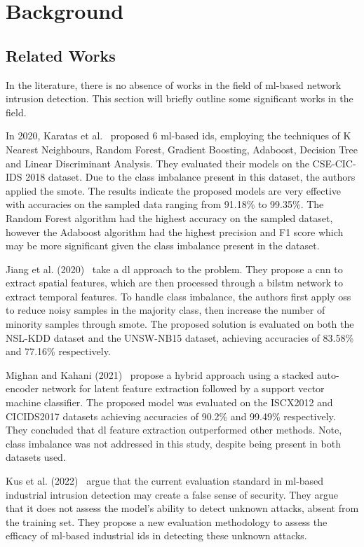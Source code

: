 \chapter{Background}%
\label{chp:background}

\section{Related Works}%
\label{sec:related}

In the literature, there is no absence of works in the field of \gls{ml}-based
network intrusion detection. This section will briefly outline some
significant works in the field.

In 2020, Karatas et al.~\cite{Karatas} proposed 6 \gls{ml}-based \gls{ids},
employing the techniques of K Nearest Neighbours, Random Forest, Gradient
Boosting, Adaboost, Decision Tree and Linear Discriminant Analysis. They
evaluated their models on the CSE-CIC-IDS 2018 dataset. Due to the class
imbalance present in this dataset, the authors applied the \gls{smote}. The
results indicate the proposed models are very effective with accuracies on the
sampled data ranging from 91.18\% to 99.35\%. The Random Forest algorithm had
the highest accuracy on the sampled dataset, however the Adaboost algorithm had
the highest precision and F1 score which may be more significant given the
class imbalance present in the dataset.

Jiang et al. (2020)~\cite{Jiang} take a \gls{dl} approach to the problem. They
propose a \gls{cnn} to extract spatial features, which are then processed
through a \gls{bilstm} network to extract temporal features. To handle class
imbalance, the authors first apply \gls{oss} to reduce noisy samples in the
majority class, then increase the number of minority samples through
\gls{smote}. The proposed solution is evaluated on both the NSL-KDD dataset and
the UNSW-NB15 dataset, achieving accuracies of 83.58\% and 77.16\%
respectively.

Mighan and Kahani (2021)~\cite{Mighan} propose a hybrid approach using a
stacked auto-encoder network for latent feature extraction followed by a
support vector machine classifier. The proposed model was evaluated on the
ISCX2012 and CICIDS2017 datasets achieving accuracies of 90.2\% and 99.49\%
respectively. They concluded that \gls{dl} feature extraction outperformed
other methods. Note, class imbalance was not addressed in this study, despite
being present in both datasets used.

Kus et al. (2022)~\cite{Kus} argue that the current evaluation standard in
\gls{ml}-based industrial intrusion detection may create a false sense of
security. They argue that it does not assess the model's ability to detect
unknown attacks, absent from the training set. They propose a new evaluation
methodology to assess the efficacy of \gls{ml}-based industrial \gls{ids} in
detecting these unknown attacks.

